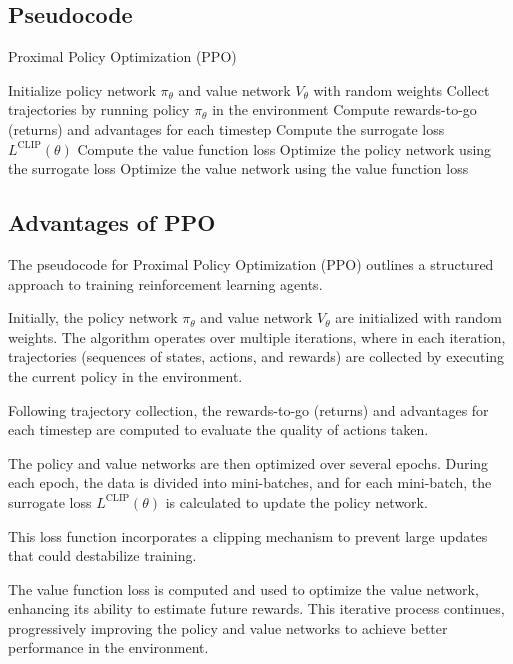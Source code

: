 \documentclass{article}
\begin{document}
\subsection{Pseudocode}

\begin{algorithm}
\caption{Proximal Policy Optimization (PPO)}
\begin{algorithmic}[1]
\State Initialize policy network $\pi_\theta$ and value network $V_\theta$ with random weights
    \State Collect trajectories by running policy $\pi_\theta$ in the environment
    \State Compute rewards-to-go (returns) and advantages for each timestep
            \State Compute the surrogate loss $L^{\text{CLIP}}(\theta)$
            \State Compute the value function loss
            \State Optimize the policy network using the surrogate loss
            \State Optimize the value network using the value function loss
        \EndFor
    \EndFor
\EndFor
\end{algorithmic}
\end{algorithm}

\subsection{Advantages of PPO}

The pseudocode for Proximal Policy Optimization (PPO) outlines a structured approach to training reinforcement learning agents.

Initially, the policy network $\pi_\theta$ and value network $V_\theta$ are initialized with random weights. The algorithm operates over multiple iterations, where in each iteration, trajectories (sequences of states, actions, and rewards) are collected by executing the current policy in the environment.

Following trajectory collection, the rewards-to-go (returns) and advantages for each timestep are computed to evaluate the quality of actions taken.

The policy and value networks are then optimized over several epochs. During each epoch, the data is divided into mini-batches, and for each mini-batch, the surrogate loss $L^{\text{CLIP}}(\theta)$ is calculated to update the policy network.

This loss function incorporates a clipping mechanism to prevent large updates that could destabilize training.

The value function loss is computed and used to optimize the value network, enhancing its ability to estimate future rewards. This iterative process continues, progressively improving the policy and value networks to achieve better performance in the environment.
\end{document}
